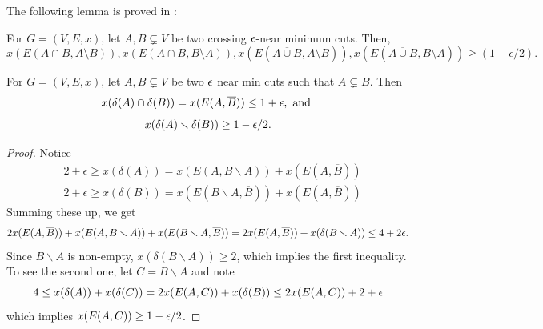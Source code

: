 The following lemma is proved in \cite{Ben97}:
\begin{lemma}
\label{lem:nmcuts_largeedges}
For $G=(V,E,x)$, let $A,B\subsetneq V$ be two crossing ${\epsilon}$-near minimum cuts. %
Then, $$x(E(A\cap B, A\setminus B)),x(E(A\cap B, B\setminus A)), x(E(\overline{A\cup B}, A\setminus B)), x(E( \overline{A\cup B}, B\setminus A)) \geq (1-\epsilon/2).$$
\end{lemma}
%
\begin{lemma}
\label{lem:shared-edges}
For $G=(V,E,x)$, let $A,B\subsetneq V$ be two ${\epsilon}$ near min cuts  such that $A \subsetneq B$. Then 
$$x(\delta(A) \cap \delta(B)) = x(E(A,\overline{B}))\le 1 + {\epsilon}, \text{ and }$$
$$x(\delta(A)\smallsetminus \delta(B))\geq 1-{\epsilon}/2. $$
\end{lemma}
\begin{proof}
Notice
\begin{align*}&2+\epsilon \ge x(\delta(A)) = x(E(A,B \smallsetminus A)) + x(E(A,\overline{B}))\\
&2+\epsilon \ge x(\delta(B)) = x(E(B \smallsetminus A,\overline{B})) + x(E(A,\overline{B}))
\end{align*}
Summing these up, we get
$$2x(E(A,\overline{B})) + x(E(A,B \smallsetminus A)) + x(E(B \smallsetminus A, \overline{B})) = 2x(E(A,\overline{B}))+x(\delta(B\smallsetminus A)) \le 4+2{\epsilon}.$$
Since $B \smallsetminus A$ is non-empty,
	$x(\delta(B\smallsetminus A)) \ge 2$,
which implies the first inequality.
To see the second one, let $C=B\smallsetminus A$ and note
$$ 4\leq x(\delta(A))+x(\delta(C)) = 2 x(E(A,C)) + x(\delta(B))\leq 2 x(E(A,C))+ 2+{\epsilon}$$
which implies $x(E(A,C))\geq 1-{\epsilon}/2$.
\end{proof}

